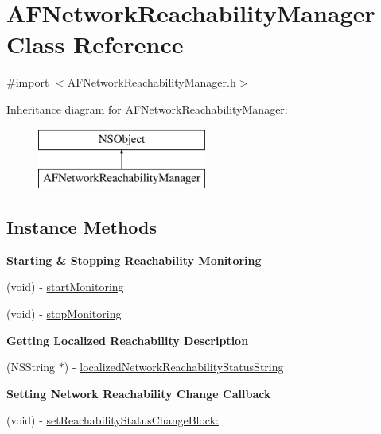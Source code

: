 \hypertarget{interface_a_f_network_reachability_manager}{}\section{A\+F\+Network\+Reachability\+Manager Class Reference}
\label{interface_a_f_network_reachability_manager}


{\ttfamily \#import $<$A\+F\+Network\+Reachability\+Manager.\+h$>$}

Inheritance diagram for A\+F\+Network\+Reachability\+Manager\+:\begin{figure}[H]
\begin{center}
\leavevmode
\includegraphics[height=2.000000cm]{interface_a_f_network_reachability_manager}
\end{center}
\end{figure}
\subsection*{Instance Methods}
\begin{Indent}{\bf Starting \& Stopping Reachability Monitoring}\par
{\em 

 

 }\begin{DoxyCompactItemize}
\item 
(void) -\/ \hyperlink{interface_a_f_network_reachability_manager_aa455bdcd0711021421aef6e2f87f62d7}{start\+Monitoring}
\item 
(void) -\/ \hyperlink{interface_a_f_network_reachability_manager_a3494d1eb9e2537cbd828e3632fc8e6ca}{stop\+Monitoring}
\end{DoxyCompactItemize}
\end{Indent}
\begin{Indent}{\bf Getting Localized Reachability Description}\par
{\em 

 

 }\begin{DoxyCompactItemize}
\item 
(N\+S\+String $\ast$) -\/ \hyperlink{interface_a_f_network_reachability_manager_afe6a32b5ab75661a802e6bbefaa74e2d}{localized\+Network\+Reachability\+Status\+String}
\end{DoxyCompactItemize}
\end{Indent}
\begin{Indent}{\bf Setting Network Reachability Change Callback}\par
{\em 

 

 }\begin{DoxyCompactItemize}
\item 
(void) -\/ \hyperlink{interface_a_f_network_reachability_manager_af699fc54a9252690a660e8454af70dc9}{set\+Reachability\+Status\+Change\+Block\+:}
\end{DoxyCompactItemize}
\end{Indent}
